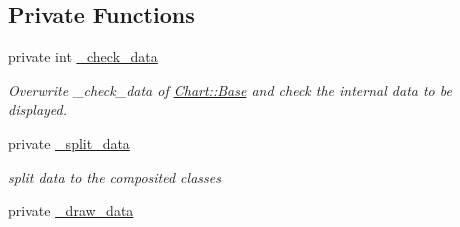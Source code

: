 \subsection*{Private Functions}
\label{_amgrp8d29cff216bafa3117e21883ea7c6b5f}
 \begin{DoxyCompactItemize}
\item 
private int \hyperlink{classChart_1_1Composite_a67af0ad77d0c1f4f74da434ceb9cf53c}{\_\-check\_\-data}
\begin{DoxyCompactList}\small\item\em Overwrite \_\-check\_\-data of \hyperlink{classChart_1_1Base}{Chart::Base} and check the internal data to be displayed. \item\end{DoxyCompactList}\item 
private \hyperlink{classChart_1_1Composite_ae4eb768b4ef9d49dc0011bc3f49dab93}{\_\-split\_\-data}
\begin{DoxyCompactList}\small\item\em split data to the composited classes \item\end{DoxyCompactList}\item 
\hypertarget{classChart_1_1Composite_a9fdfe5ec7b8e6aa63797d1e9ae0e4536}{
private \hyperlink{classChart_1_1Composite_a9fdfe5ec7b8e6aa63797d1e9ae0e4536}{\_\-draw\_\-data}}
\label{classChart_1_1Composite_a9fdfe5ec7b8e6aa63797d1e9ae0e4536}


\end{DoxyCompactItemize}
